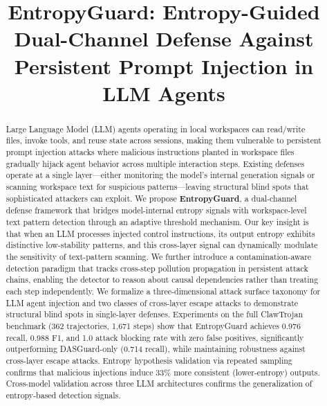 \documentclass[conference]{IEEEtran}
\begin{document}
\title{EntropyGuard: Entropy-Guided Dual-Channel Defense Against\\Persistent Prompt Injection in LLM Agents}

\author{
}

\maketitle

\begin{abstract}
Large Language Model (LLM) agents operating in local workspaces can read/write files, invoke tools, and reuse state across sessions, making them vulnerable to persistent prompt injection attacks where malicious instructions planted in workspace files gradually hijack agent behavior across multiple interaction steps. Existing defenses operate at a single layer---either monitoring the model's internal generation signals or scanning workspace text for suspicious patterns---leaving structural blind spots that sophisticated attackers can exploit. We propose \textbf{EntropyGuard}, a dual-channel defense framework that bridges model-internal entropy signals with workspace-level text pattern detection through an adaptive threshold mechanism. Our key insight is that when an LLM processes injected control instructions, its output entropy exhibits distinctive low-stability patterns, and this cross-layer signal can dynamically modulate the sensitivity of text-pattern scanning. We further introduce a contamination-aware detection paradigm that tracks cross-step pollution propagation in persistent attack chains, enabling the detector to reason about causal dependencies rather than treating each step independently. We formalize a three-dimensional attack surface taxonomy for LLM agent injection and two classes of cross-layer escape attacks to demonstrate structural blind spots in single-layer defenses. Experiments on the full ClawTrojan benchmark (362 trajectories, 1,671 steps) show that EntropyGuard achieves 0.976 recall, 0.988 F1, and 1.0 attack blocking rate with zero false positives, significantly outperforming DASGuard-only (0.714 recall), while maintaining robustness against cross-layer escape attacks. Entropy hypothesis validation via repeated sampling confirms that malicious injections induce 33\% more consistent (lower-entropy) outputs. Cross-model validation across three LLM architectures confirms the generalization of entropy-based detection signals.
\end{abstract}
\end{document}
